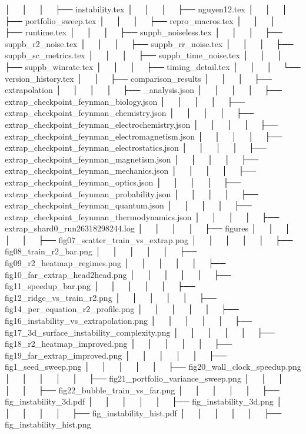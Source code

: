 │   │       │           ├── instability.tex
│   │       │           ├── nguyen12.tex
│   │       │           ├── portfolio_sweep.tex
│   │       │           ├── repro_macros.tex
│   │       │           ├── runtime.tex
│   │       │           ├── suppb_noiseless.tex
│   │       │           ├── suppb_r2_noise.tex
│   │       │           ├── suppb_rr_noise.tex
│   │       │           ├── suppb_sc_metrics.tex
│   │       │           ├── suppb_time_noise.tex
│   │       │           ├── suppb_winrate.tex
│   │       │           ├── timing_detail.tex
│   │       │           └── version_history.tex
│   │       ├── comparison_results
│   │       │   ├── extrapolation
│   │       │   │   ├── _analysis.json
│   │       │   │   ├── extrap_checkpoint_feynman_biology.json
│   │       │   │   ├── extrap_checkpoint_feynman_chemistry.json
│   │       │   │   ├── extrap_checkpoint_feynman_electrochemistry.json
│   │       │   │   ├── extrap_checkpoint_feynman_electromagnetism.json
│   │       │   │   ├── extrap_checkpoint_feynman_electrostatics.json
│   │       │   │   ├── extrap_checkpoint_feynman_magnetism.json
│   │       │   │   ├── extrap_checkpoint_feynman_mechanics.json
│   │       │   │   ├── extrap_checkpoint_feynman_optics.json
│   │       │   │   ├── extrap_checkpoint_feynman_probability.json
│   │       │   │   ├── extrap_checkpoint_feynman_quantum.json
│   │       │   │   ├── extrap_checkpoint_feynman_thermodynamics.json
│   │       │   │   ├── extrap_shard0_run26318298244.log
│   │       │   │   ├── figures
│   │       │   │   │   ├── fig07_scatter_train_vs_extrap.png
│   │       │   │   │   ├── fig08_train_r2_bar.png
│   │       │   │   │   ├── fig09_r2_heatmap_regimes.png
│   │       │   │   │   ├── fig10_far_extrap_head2head.png
│   │       │   │   │   ├── fig11_speedup_bar.png
│   │       │   │   │   ├── fig12_ridge_vs_train_r2.png
│   │       │   │   │   ├── fig14_per_equation_r2_profile.png
│   │       │   │   │   ├── fig16_instability_vs_extrapolation.png
│   │       │   │   │   ├── fig17_3d_surface_instability_complexity.png
│   │       │   │   │   ├── fig18_r2_heatmap_improved.png
│   │       │   │   │   ├── fig19_far_extrap_improved.png
│   │       │   │   │   ├── fig1_seed_sweep.png
│   │       │   │   │   ├── fig20_wall_clock_speedup.png
│   │       │   │   │   ├── fig21_portfolio_variance_sweep.png
│   │       │   │   │   ├── fig22_bubble_train_vs_far.png
│   │       │   │   │   ├── fig_instability_3d.pdf
│   │       │   │   │   ├── fig_instability_3d.png
│   │       │   │   │   ├── fig_instability_hist.pdf
│   │       │   │   │   ├── fig_instability_hist.png
